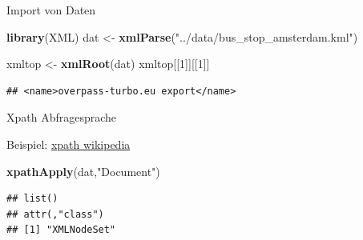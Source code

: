 \documentclass[ignorenonframetext,]{beamer}
\newenvironment{Shaded}{\begin{snugshade}}{\end{snugshade}}
\newcommand{\DecValTok}[1]{\textcolor[rgb]{0.27,0.67,0.26}{#1}}
\newcommand{\KeywordTok}[1]{\textcolor[rgb]{0.26,0.66,0.93}{\textbf{#1}}}
\newcommand{\NormalTok}[1]{\textcolor[rgb]{0.74,0.68,0.62}{#1}}
\newcommand{\StringTok}[1]{\textcolor[rgb]{0.02,0.61,0.04}{#1}}
\begin{document}
\begin{frame}[fragile]{Import von Daten}
\protect\hypertarget{import-von-daten}{}

\begin{Shaded}
\begin{Highlighting}[]
\KeywordTok{library}\NormalTok{(XML)}
\NormalTok{dat <-}\StringTok{ }\KeywordTok{xmlParse}\NormalTok{(}\StringTok{"../data/bus_stop_amsterdam.kml"}\NormalTok{)}
\end{Highlighting}
\end{Shaded}

\begin{Shaded}
\begin{Highlighting}[]
\NormalTok{xmltop <-}\StringTok{ }\KeywordTok{xmlRoot}\NormalTok{(dat)}
\NormalTok{xmltop[[}\DecValTok{1}\NormalTok{]][[}\DecValTok{1}\NormalTok{]]}
\end{Highlighting}
\end{Shaded}

\begin{verbatim}
## <name>overpass-turbo.eu export</name>
\end{verbatim}

\end{frame}

\begin{frame}[fragile]{Xpath Abfragesprache}
\protect\hypertarget{xpath-abfragesprache}{}

\begin{block}{Beispiel: \href{https://de.wikipedia.org/wiki/XPath}{xpath
wikipedia}}

\begin{Shaded}
\begin{Highlighting}[]
\KeywordTok{xpathApply}\NormalTok{(dat,}\StringTok{"Document"}\NormalTok{)}
\end{Highlighting}
\end{Shaded}

\begin{verbatim}
## list()
## attr(,"class")
## [1] "XMLNodeSet"
\end{verbatim}

\end{block}

\end{frame}
\end{document}
